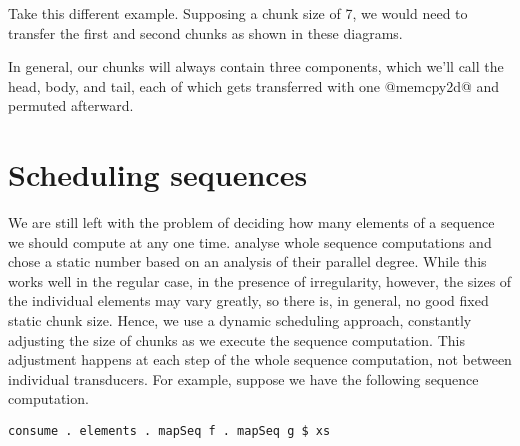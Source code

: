 Take this different example. Supposing a chunk size of 7, we would need to transfer the first and second chunks as shown in these diagrams.


In general, our chunks will always contain three components, which we'll call the head, body, and tail, each of which gets transferred with one @memcpy2d@ and permuted afterward.


\section{Scheduling sequences}
\label{sec:scheduling}

We are still left with the problem of deciding how many elements of a sequence we should compute at any one time. \citet{Madsen:2015} analyse whole sequence computations and chose a static number based on an analysis of their parallel degree. While this works well in the regular case, in the presence of irregularity, however, the sizes of the individual elements may vary greatly, so there is, in general, no good fixed static chunk size. Hence, we use a dynamic scheduling approach, constantly adjusting the size of chunks as we execute the sequence computation. This adjustment happens at each step of the whole sequence computation, not between individual transducers. For example, suppose we have the following sequence computation.
%
\begin{lstlisting}
consume . elements . mapSeq f . mapSeq g $ xs
\end{lstlisting}
%
